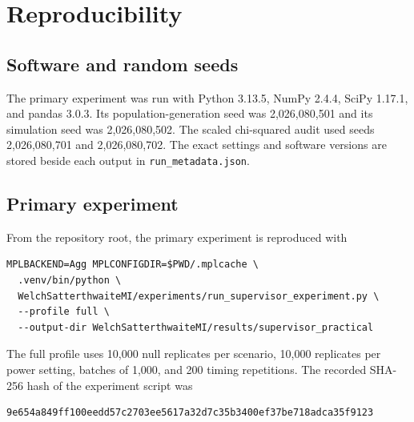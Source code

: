 \chapter{Reproducibility}
\label{app:reproducibility}

\section{Software and random seeds}

The primary experiment was run with Python 3.13.5, NumPy 2.4.4, SciPy
1.17.1, and pandas 3.0.3. Its population-generation seed was 2,026,080,501
and its simulation seed was 2,026,080,502. The scaled chi-squared audit used
seeds 2,026,080,701 and 2,026,080,702. The exact settings and software
versions are stored beside each output in \texttt{run\_metadata.json}.

\section{Primary experiment}

From the repository root, the primary experiment is reproduced with
\begin{verbatim}
MPLBACKEND=Agg MPLCONFIGDIR=$PWD/.mplcache \
  .venv/bin/python \
  WelchSatterthwaiteMI/experiments/run_supervisor_experiment.py \
  --profile full \
  --output-dir WelchSatterthwaiteMI/results/supervisor_practical
\end{verbatim}
The full profile uses 10,000 null replicates per scenario, 10,000 replicates
per power setting, batches of 1,000, and 200 timing repetitions. The recorded
SHA-256 hash of the experiment script was
\begin{verbatim}
9e654a849ff100eedd57c2703ee5617a32d7c35b3400ef37be718adca35f9123
\end{verbatim}

